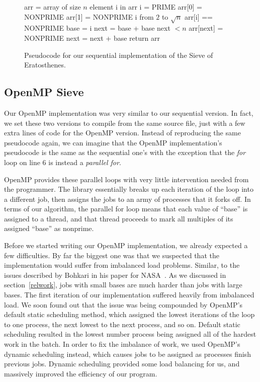 \documentclass[11pt,twocolumn]{article}
\begin{document}
\begin{figure}
    \begin{codebox}
        \li arr = array of size $n$
        \li {} element i in arr
        \Do
            \li i = PRIME
        \End
        \li arr[0] = NONPRIME
        \li arr[1] = NONPRIME
        \li {} i from $2$ to $\sqrt{n}$
        \Do
            \li \If arr[i] == NONPRIME
            \Do
                \li base = i
                \li next = base + base
                \li {} next $< n$
                \Do
                    \li arr[next] = NONPRIME
                    \li next = next + base
                \End
            \End
        \End
        \li return arr
    \end{codebox}
    \caption{{\label{seqpseud}} Pseudocode for our sequential implementation
    of the Sieve of Eratosthenes.}
\end{figure}

\subsection{OpenMP Sieve}\label{openmpsection}

Our OpenMP implementation was very similar to our sequential version. In fact,
we set these two versions to compile from the same source file, just with a
few extra lines of code for the OpenMP version. Instead of reproducing
the same pseudocode again, we can imagine that the OpenMP implementation's
pseudocode is the same as the sequential one's with the exception
that the \textit{for} loop on line 6 is instead a \textit{parallel for}.

OpenMP provides these parallel loops with very little intervention needed
from the programmer. The library essentially breaks up each iteration
of the loop into a different job, then assigns the jobs to an army
of processes that it forks off. In terms of our algorithm, the parallel for
loop means that each value of ``base'' is assigned to a thread, and that thread
proceeds to mark all multiples of its assigned ``base'' as nonprime.

Before we started writing our OpenMP implementation, we already expected
a few difficulties. By far the biggest one was that we suspected that
the implementation would suffer from imbalanced load problems. Similar,
to the issues described by Bohkari in his paper for NASA~\cite{Bohkari}.
As we discussed in section~\ref{relwork}, jobs with small bases
are much harder than jobs with large bases. The first iteration of
our implementation suffered heavily from imbalanced load. We soon found out that
the issue was being compounded by OpenMP's default static scheduling
method, which assigned the lowest iterations of the loop to one process,
the next lowest to the next process, and so on. Default static scheduling
resulted in the lowest number process being assigned all of the hardest
work in the batch. In order to fix the imbalance of work, we used OpenMP's 
dynamic scheduling instead, which causes jobs to be assigned as processes 
finish previous jobs. Dynamic scheduling provided some load balancing for us,
and massively improved the efficiency of our program.
\end{document}
